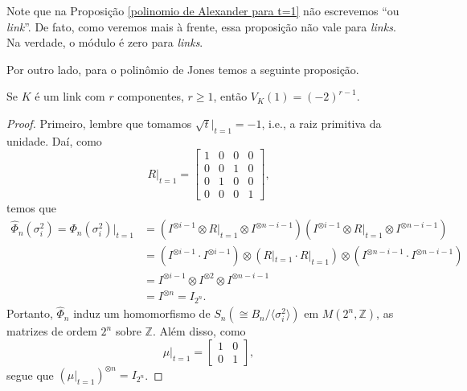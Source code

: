	Note que na Proposição \ref{polinomio de Alexander para t=1} não escrevemos ``ou \textit{link}''. 
	De fato, como veremos mais à frente, essa proposição não vale para \textit{links}. 
	Na verdade, o módulo é zero para \textit{links}.
	
	\par\vspace{0.3cm} Por outro lado, para o polinômio de Jones temos a seguinte proposição.
	\begin{prop}
	\label{polinomio de Jones para links}
		Se $K$ é um link com $r$ componentes, $r\geq 1$, então $V_K(1) = (-2)^{r-1}$.
	\end{prop}
	\begin{proof}
		Primeiro, lembre que tomamos $\sqrt{t}|_{t=1} = -1$, i.e., a raiz primitiva da unidade. 
		Daí, como
		\begin{equation*}
    		R|_{t=1} = \begin{bmatrix}
    		1 & 0 & 0 & 0 \\
    		0 & 0 & 1 & 0 \\
    		0 & 1 & 0 & 0 \\
    		0 & 0 & 0 & 1
    		\end{bmatrix},
		\end{equation*}
		temos que
		\begin{align*}
    		\widehat{\Phi}_n(\sigma_i^2) 
    		= \Phi_n(\sigma_i^2)|_{t=1} 
    		&= ( I^{\otimes i-1} \otimes R|_{t=1} \otimes I^{\otimes n-i-1} )( I^{\otimes i-1} 
    		\otimes R|_{t=1} \otimes I^{\otimes n-i-1} ) \\
    		&= ( I^{\otimes i-1}\cdot I^{\otimes i-1} )\otimes( R|_{t=1}\cdot R|_{t=1} )
    		\otimes( I^{\otimes n-i-1}\cdot I^{\otimes n-i-1} ) \\
    		&= I^{\otimes i-1}\otimes I^{\otimes 2}\otimes I^{\otimes n-i-1} \\
    		&= I^{\otimes n} = I_{2^n}.
		\end{align*}
		Portanto, $\widehat{\Phi}_n$ induz um homomorfismo de $S_n ( \cong B_n/\langle \sigma_i^2 \rangle )$ 
		em $M(2^n, \mathbb{Z})$, as matrizes de ordem $2^n$ sobre $\mathbb{Z}$. Além disso, como
		\begin{equation*}
    		\mu|_{t=1} = \begin{bmatrix}
    		1 & 0 \\
    		0 & 1
    		\end{bmatrix},
		\end{equation*}
		segue que $(\mu|_{t=1})^{\otimes n} = I_{2^n}$.
		

\end{proof}
